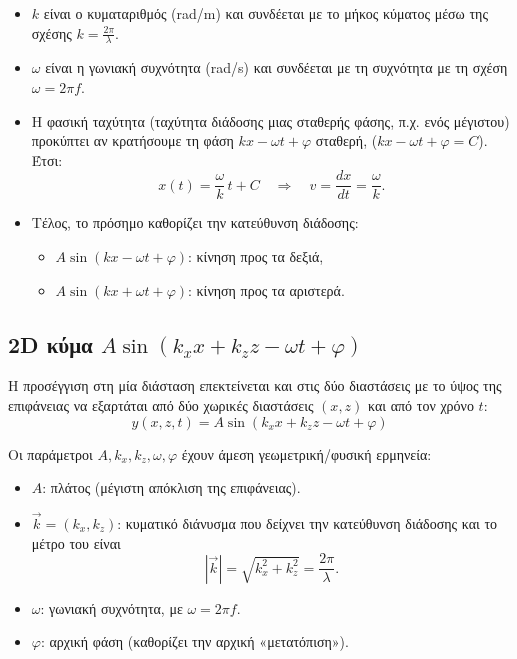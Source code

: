 \documentclass[a4paper, 11pt]{article}
\begin{document}
\begin{itemize}
\item
  \(k\) είναι ο κυματαριθμός (rad/m) και συνδέεται με το μήκος κύματος
  μέσω της σχέσης \(k=\frac{2\pi}{\lambda}\).
\item
  \(\omega\) είναι η γωνιακή συχνότητα (rad/s) και συνδέεται με τη
  συχνότητα με τη σχέση \(\omega=2\pi f\).
\item
  Η φασική ταχύτητα (ταχύτητα διάδοσης μιας σταθερής φάσης, π.χ. ενός
  μέγιστου) προκύπτει αν κρατήσουμε τη φάση \(kx-\omega t+\varphi\)
  σταθερή, (\(kx-\omega t+\varphi = C\)). Έτσι: \[
  x(t)=\frac{\omega}{k}\,t+C
  \quad\Rightarrow\quad
  v=\frac{dx}{dt}=\frac{\omega}{k}.
  \]
\item
  Τέλος, το πρόσημο καθορίζει την κατεύθυνση διάδοσης:

  \begin{itemize}
  \item
    \(A\sin(kx-\omega t+\varphi)\): κίνηση προς τα δεξιά,
  \item
    \(A\sin(kx+\omega t+\varphi)\): κίνηση προς τα αριστερά.
  \end{itemize}
\end{itemize}

\subsection{\texorpdfstring{2D κύμα
\(A\sin(k_x x + k_z z - \omega t + \varphi)\)}{2D κύμα A\textbackslash sin(k\_x x + k\_z z - \textbackslash omega t + \textbackslash varphi)}}\label{d-ux3baux3cdux3bcux3b1-asink_x-x-k_z-z---omega-t-varphi}

Η προσέγγιση στη μία διάσταση επεκτείνεται και στις δύο διαστάσεις με το
ύψος της επιφάνειας να εξαρτάται από δύο χωρικές διαστάσεις \((x,z)\)
και από τον χρόνο \(t\):
\[y(x,z,t)=A\sin(k_x x + k_z z - \omega t + \varphi)\]

Οι παράμετροι \(A, k_x, k_z, \omega, \varphi\) έχουν άμεση
γεωμετρική/φυσική ερμηνεία:

\begin{itemize}
\item
  \(A\): πλάτος (μέγιστη απόκλιση της επιφάνειας).
\item
  \(\vec{k}=(k_x,k_z)\): κυματικό διάνυσμα που δείχνει την κατεύθυνση
  διάδοσης και το μέτρο του είναι \[
  |\vec{k}|=\sqrt{k_x^2+k_z^2}=\frac{2\pi}{\lambda}.
  \]
\item
  \(\omega\): γωνιακή συχνότητα, με \(\omega=2\pi f\).
\item
  \(\varphi\): αρχική φάση (καθορίζει την αρχική «μετατόπιση»).
\end{itemize}
\end{document}
